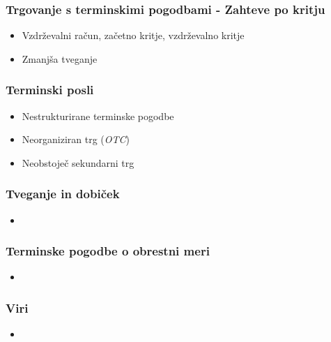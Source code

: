 \documentclass[14pt]{beamer}
\begin{document}
\begin{frame}
    \frametitle{Trgovanje s terminskimi pogodbami - Zahteve po kritju}
    
    \begin{itemize}
        \item Vzdrževalni račun, začetno kritje, vzdrževalno kritje
        \item Zmanjša tveganje 
    \end{itemize}


\end{frame}

\begin{frame}
    \frametitle{Terminski posli}
    
    \begin{itemize}
        \item Nestrukturirane terminske pogodbe
        \item Neorganiziran trg (\textit{OTC})
        \item Neobstoječ sekundarni trg
    \end{itemize}


\end{frame}

\begin{frame}
    \frametitle{Tveganje in dobiček}
    
    \begin{itemize}
        \item
    \end{itemize}

\end{frame}

\begin{frame}
    \frametitle{Terminske pogodbe o obrestni meri}
    
    \begin{itemize}
        \item
    \end{itemize}

\end{frame}

\begin{frame}
    \frametitle{Viri}
    
    \begin{itemize}
        \item
    \end{itemize}

\end{frame}
\end{document}
